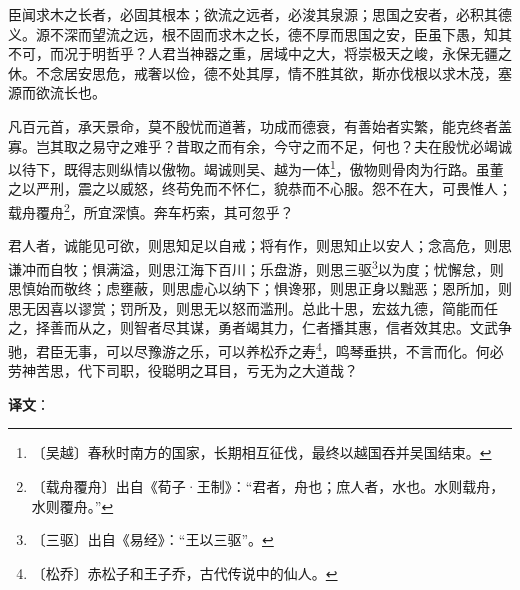 \documentclass[12pt,UTF-8,openany]{ctexbook}
\begin{document}
\begin{normalsize}
    
    臣闻求木之长者，必固其根本；欲流之远者，必浚其泉源；思国之安者，必积其德义。源不深而望流之远，根不固而求木之长，德不厚而思国之安，臣虽下愚，知其不可，而况于明哲乎？人君当神器之重，居域中之大，将崇极天之峻，永保无疆之休。不念居安思危，戒奢以俭，德不处其厚，情不胜其欲，斯亦伐根以求木茂，塞源而欲流长也。
    
    凡百元首，承天景命，莫不殷忧而道著，功成而德衰，有善始者实繁，能克终者盖寡。岂其取之易守之难乎？昔取之而有余，今守之而不足，何也？夫在殷忧必竭诚以待下，既得志则纵情以傲物。竭诚则吴、越为一体\footnote{〔吴越〕春秋时南方的国家，长期相互征伐，最终以越国吞并吴国结束。}，傲物则骨肉为行路。虽董之以严刑，震之以威怒，终苟免而不怀仁，貌恭而不心服。怨不在大，可畏惟人；载舟覆舟\footnote{〔载舟覆舟〕出自《荀子·王制》：“君者，舟也；庶人者，水也。水则载舟，水则覆舟。”}，所宜深慎。奔车朽索，其可忽乎？
    
    君人者，诚能见可欲，则思知足以自戒；将有作，则思知止以安人；念高危，则思谦冲而自牧；惧满溢，则思江海下百川；乐盘游，则思三驱\footnote{〔三驱〕出自《易经》：“王以三驱”。}以为度；忧懈怠，则思慎始而敬终；虑壅蔽，则思虚心以纳下；惧谗邪，则思正身以黜恶；恩所加，则思无因喜以谬赏；罚所及，则思无以怒而滥刑。总此十思，宏兹九德，简能而任之，择善而从之，则智者尽其谋，勇者竭其力，仁者播其惠，信者效其忠。文武争驰，君臣无事，可以尽豫游之乐，可以养松乔之寿\footnote{〔松乔〕赤松子和王子乔，古代传说中的仙人。}，鸣琴垂拱，不言而化。何必劳神苦思，代下司职，役聪明之耳目，亏无为之大道哉？
\end{normalsize}


\newpage

\textbf{译文}：

\vspace{1em}
\end{document}

